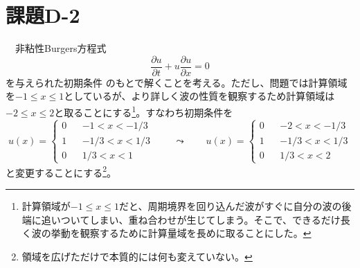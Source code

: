 \documentclass[ja=standard,xelatex]{bxjsarticle}
\newcommand{\neqn}[1]{\begin{equation}{#1}\end{equation}}
\newcommand{\pdif}[2]{\dfrac{\partial{#1}}{\partial#2}}
\newcommand{\bracketnormal}[1]{\left(#1\right)}
\begin{document}
\section{課題D-2}
　非粘性Burgers方程式
\neqn{
  \pdif{u}{t} + u\pdif{u}{x} = 0
}
を与えられた初期条件
のもとで解くことを考える。ただし、問題では計算領域を$-1\leq x\leq 1$としているが、より詳しく波の性質を観察するため計算領域は$-2\leq x \leq 2$と取ることにする\footnote{
  計算領域が$-1\leq x\leq 1$だと、周期境界を回り込んだ波がすぐに自分の波の後端に追いついてしまい、重ね合わせが生じてしまう。そこで、できるだけ長く波の挙動を観察するために計算量域を長めに取ることにした。
}。すなわち初期条件を
\neqn{
  u\bracketnormal{x} = \left\{\begin{aligned}
    0 && -1<x<-1/3 \\
    1 && -1/3<x<1/3\\
    0 && 1/3 < x < 1
  \end{aligned}\right.
  \qquad \leadsto\qquad
  u\bracketnormal{x} = \left\{\begin{aligned}
    0 && -2<x<-1/3 \\
    1 && -1/3<x<1/3\\
    0 && 1/3 < x < 2
  \end{aligned}\right.
}
と変更することにする\footnote{領域を広げただけで本質的には何も変えていない。}。
\end{document}
